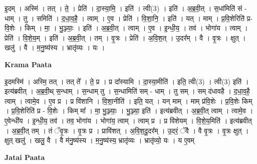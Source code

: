 \documentclass[17pt]{extarticle}
\begin{document}
इ॒दम् । अस्मि॑ । तत् । ते॒ । प्रेति॑ । दा॒स्या॒मि॒ । इति॑ । त्वी(3) । इति॑ । अ॒ब्र॒वी॒त् । स॒धांमिति॑ सं - धाम् । तु । समिति॑ । द॒धा॒व॒है॒ । त्वाम् । ए॒व । प्रेति॑ । वि॒शा॒नि॒ । इति॑ । यत् । माम् । प्र॒वि॒शेरिति॑ प्र-वि॒शेः । किम् । मा॒ । भु॒ञ्ज्याः॒ । इति॑ । अ॒ब्र॒वी॒त् । त्वाम् । ए॒व । इ॒न्धी॒य॒ । तव॑ । भोगा॑य । त्वाम् । प्रेति॑ । वि॒शे॒य॒म् । इति॑ । अ॒ब्र॒वी॒त् । तम् । वृ॒त्रः । प्रेति॑ । अ॒वि॒श॒त् । उ॒दर᳚म् । वै । वृ॒त्रः । क्षुत् । खलु॑ । वै । म॒नु॒ष्य॑स्य । भ्रातृ॑व्यः । यः ।  \newline


\textbf{Krama Paata} \newline

इ॒दमस्मि॑ । अस्मि॒ तत् । तत् ते᳚ । ते॒ प्र । प्र दा᳚स्यामि । दा॒स्या॒मीति॑ । इति॒ त्वी(3) । त्वी(3) इति॑ । इत्य॑ब्रवीत् । अ॒ब्र॒वी॒थ् स॒न्धाम् । स॒न्धाम् तु । स॒न्धामिति॑ सम् - धाम् । तु सम् । सम् द॑धावहै । द॒धा॒व॒है॒ त्वाम् । त्वामे॒व । ए॒व प्र । प्र वि॑शानि । वि॒शा॒नीति॑ । इति॒ यत् । यन् माम् । माम् प्र॑वि॒शेः । प्र॒वि॒शेः किम् । प्र॒वि॒शेरिति॑ प्र - वि॒शेः । किम् मा᳚ । मा॒ भु॒ञ्ज्याः॒ । भु॒ञ्ज्या॒ इति॑ । इत्य॑ब्रवीत् । अ॒ब्र॒वी॒त् त्वाम् । त्वामे॒व । ए॒वेन्धी॑य । इ॒न्धी॒य॒ तव॑ । तव॒ भोगा॑य । भोगा॑य॒ त्वाम् । त्वाम् प्र । प्र वि॑शेयम् । वि॒शे॒य॒मिति॑ । इत्य॑ब्रवीत् । अ॒ब्र॒वी॒त् तम् । तं ॅवृ॒त्रः । वृ॒त्रः प्र । प्रावि॑शत् । अ॒वि॒श॒दु॒दर᳚म् । उ॒दरं॒ ॅवै । वै वृ॒त्रः । वृ॒त्रः क्षुत् । क्षुत् खलु॑ । खलु॒ वै । वै म॑नु॒ष्य॑स्य । म॒नु॒ष्य॑स्य॒ भ्रातृ॑व्यः । भ्रातृ॑व्यो॒ यः । य ए॒वम् \newline

\textbf{Jatai Paata} \newline
\end{document}

